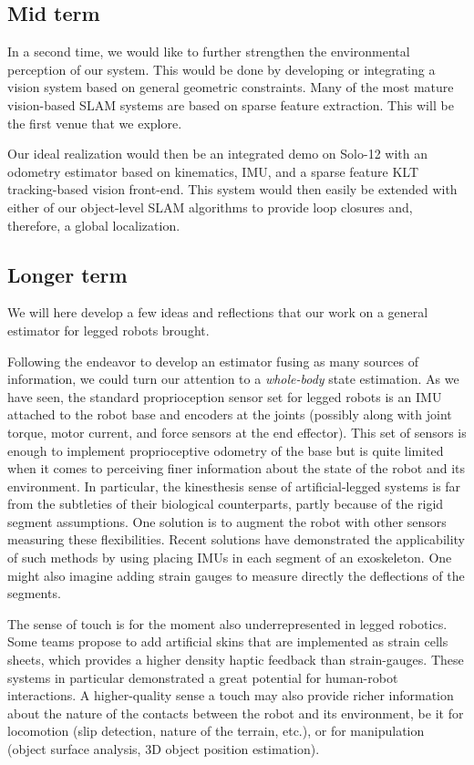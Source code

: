 \subsection{Mid term}

In a second time, we would like to further strengthen the environmental perception of our system. This would be done by developing or integrating a vision system
based on general geometric constraints. Many of the most mature vision-based SLAM systems are based on sparse feature extraction. This will be 
the first venue that we explore. 

Our ideal realization would then be an integrated demo on Solo-12 with an odometry estimator based on kinematics, IMU, and a sparse feature KLT tracking-based 
vision front-end. This system would then easily be extended with either of our object-level SLAM algorithms to provide loop closures and, therefore, a global localization.



\subsection{Longer term}

We will here develop a few ideas and reflections that our work on a general estimator for legged robots brought.

Following the endeavor to develop an estimator fusing as many sources of information, we could turn our attention to a 
\textit{whole-body} state estimation. As we have seen, the standard proprioception sensor set for legged robots is an IMU attached to the robot base
and encoders at the joints (possibly along with joint torque, motor current, and force sensors at the end effector). This set of sensors
is enough to implement proprioceptive odometry of the base but is quite limited when it comes to perceiving finer information about the state of the robot
and its environment. In particular, the kinesthesis sense of artificial-legged systems is far from the subtleties of their biological counterparts, partly
because of the rigid segment assumptions. One solution is to augment the robot with other sensors measuring these flexibilities. Recent solutions have demonstrated
the applicability of such methods by using placing IMUs in each segment of an exoskeleton. One might also imagine adding strain gauges to measure directly 
the deflections of the segments. 

The sense of touch is for the moment also underrepresented in legged robotics. Some teams propose to add
artificial skins that are implemented as strain cells sheets, which provides a higher density haptic feedback than strain-gauges. 
These systems in particular demonstrated a great potential for human-robot interactions. 
A higher-quality sense a touch may also provide richer information about the nature of the contacts between the robot and its environment, be it for locomotion
(slip detection, nature of the terrain, etc.), or for manipulation (object surface analysis, 3D object position estimation). 

